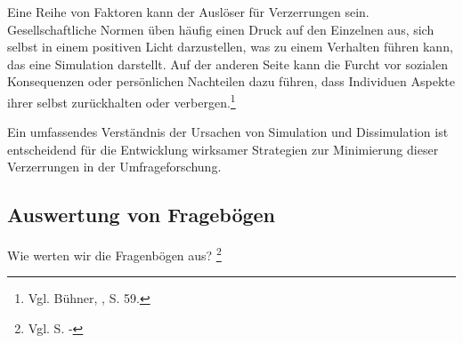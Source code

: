 Eine Reihe von Faktoren kann der Auslöser für Verzerrungen sein. Gesellschaftliche Normen üben häufig einen Druck auf
den Einzelnen aus, sich selbst in einem positiven Licht darzustellen, was zu einem Verhalten führen kann, das eine
Simulation darstellt. Auf der anderen Seite kann die Furcht vor sozialen Konsequenzen oder persönlichen Nachteilen dazu
führen, dass Individuen Aspekte ihrer selbst zurückhalten oder verbergen.\footnote{Vgl. Bühner, \cite{Einfuehrung in die TEst und Fragebogenkonstruktion}, S. 59.}

Ein umfassendes Verständnis der Ursachen von Simulation und Dissimulation ist entscheidend für die Entwicklung wirksamer
Strategien zur Minimierung dieser Verzerrungen in der Umfrageforschung.

\subsection{Auswertung von Fragebögen}
Wie werten wir die Fragenbögen aus? \footnote{Vgl. \cite{Mayer} S. -}

